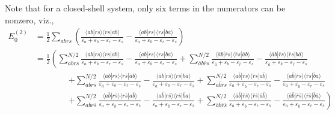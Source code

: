 \documentclass[a4paper]{book}
\newcounter{solution}[chapter]
\begin{document}
\begin{solution}
	Note that for a closed-shell system, only six terms in the numerators can be nonzero, viz.,
	\begin{align*}
		E^{(2)}_0 &= \frac{1}{2} \sum_{abrs} \left(  \frac{ \langle ab | rs \rangle \langle rs | ab \rangle  }{ \varepsilon_a + \varepsilon_b - \varepsilon_r - \varepsilon_s } - \frac{ \langle ab | rs \rangle\langle rs | ba \rangle }{ \varepsilon_a + \varepsilon_b - \varepsilon_r - \varepsilon_s } \right) \\
		&= \frac{1}{2} \left( \sum^{N/2}_{abrs} \frac{ \langle ab | rs \rangle \langle rs | ab \rangle  }{ \varepsilon_a + \varepsilon_b - \varepsilon_r - \varepsilon_s } - \frac{ \langle ab | rs \rangle\langle rs | ba \rangle }{ \varepsilon_a + \varepsilon_b - \varepsilon_r - \varepsilon_s } + \sum^{N/2}_{\bar{a}b\bar{r}s} \frac{ \langle \bar{a}b | \bar{r}s \rangle \langle \bar{r}s | \bar{a}b \rangle  }{ \varepsilon_{\bar{a}} + \varepsilon_b - \varepsilon_{\bar{r}} - \varepsilon_s } - \frac{ \langle \bar{a}b | \bar{r}s \rangle\langle \bar{r}s | b\bar{a} \rangle }{ \varepsilon_{\bar{a}} + \varepsilon_b - \varepsilon_{\bar{r}} - \varepsilon_s } \right. \\
		&\hspace{4em} \left. + \sum^{N/2}_{\bar{a}br\bar{s}} \frac{ \langle \bar{a}b | r\bar{s} \rangle \langle r\bar{s} | \bar{a}b \rangle  }{ \varepsilon_{\bar{a}} + \varepsilon_b - \varepsilon_r - \varepsilon_{\bar{s}} } - \frac{ \langle \bar{a}b | r\bar{s} \rangle\langle r\bar{s} | b\bar{a} \rangle }{ \varepsilon_{\bar{a}} + \varepsilon_b - \varepsilon_r - \varepsilon_{\bar{s}} } + \sum^{N/2}_{a\bar{b}\bar{r}s} \frac{ \langle a\bar{b} | \bar{r}s \rangle \langle \bar{r}s | a\bar{b} \rangle  }{ \varepsilon_a + \varepsilon_{\bar{b}} - \varepsilon_{\bar{r}} - \varepsilon_s } - \frac{ \langle a\bar{b} | \bar{r}s \rangle \langle \bar{r}s | \bar{b}a \rangle }{ \varepsilon_a + \varepsilon_{\bar{b}} - \varepsilon_{\bar{r}} - \varepsilon_s } \right. \\
		&\hspace{4em} \left. + \sum^{N/2}_{a\bar{b}r\bar{s}} \frac{ \langle a\bar{b} | r\bar{s} \rangle \langle r\bar{s} | a\bar{b} \rangle  }{ \varepsilon_a + \varepsilon_{\bar{b}} - \varepsilon_r - \varepsilon_{\bar{s}} } - \frac{ \langle a\bar{b} | r\bar{s} \rangle \langle r\bar{s} | \bar{b}a \rangle }{ \varepsilon_a + \varepsilon_{\bar{b}} - \varepsilon_r - \varepsilon_{\bar{s}} } + \sum^{N/2}_{\bar{a} \bar{b} \bar{r} \bar{s}} \frac{ \langle \bar{a} \bar{b} | \bar{r} \bar{s} \rangle \langle \bar{r} \bar{s} | \bar{a} \bar{b} \rangle  }{ \varepsilon_{\bar{a}} + \varepsilon_{\bar{b}} - \varepsilon_{\bar{r}} - \varepsilon_{\bar{s}} } - \frac{ \langle \bar{a} \bar{b} | \bar{r} \bar{s} \rangle \langle \bar{r} \bar{s} | \bar{b} \bar{a} \rangle }{ \varepsilon_{\bar{a}} + \varepsilon_{\bar{b}} - \varepsilon_{\bar{r}} - \varepsilon_{\bar{s}} } \right) \\

\end{align*}
\end{solution}
\end{document}
